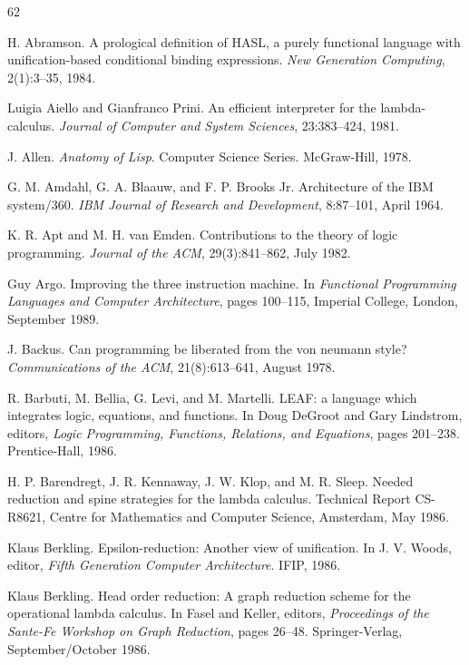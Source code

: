 \begin{thebibliography}{62}

H. Abramson.
A prological definition of HASL, a purely functional language with
unification-based conditional binding expressions.
\emph{New Generation Computing}, 2(1):3--35, 1984.

Luigia Aiello and Gianfranco Prini.
An efficient interpreter for the lambda-calculus.
\emph{Journal of Computer and System Sciences}, 23:383--424, 1981.

J. Allen.
\emph{Anatomy of Lisp}.
Computer Science Series. McGraw-Hill, 1978.

G. M. Amdahl, G. A. Blaauw, and F. P. Brooks Jr.
Architecture of the IBM system/360.
\emph{IBM Journal of Research and Development}, 8:87--101, April 1964.

K. R. Apt and M. H. van Emden.
Contributions to the theory of logic programming.
\emph{Journal of the ACM}, 29(3):841--862, July 1982.

Guy Argo.
Improving the three instruction machine.
In \emph{Functional Programming Languages and Computer Architecture}, pages
100--115, Imperial College, London, September 1989.

J. Backus.
Can programming be liberated from the von neumann style?
\emph{Communications of the ACM}, 21(8):613--641, August 1978.

R. Barbuti, M. Bellia, G. Levi, and M. Martelli.
LEAF: a language which integrates logic, equations, and functions.
In Doug DeGroot and Gary Lindstrom, editors, \emph{Logic Programming,
Functions, Relations, and Equations}, pages 201--238. Prentice-Hall, 1986.

H. P. Barendregt, J. R. Kennaway, J. W. Klop, and M. R. Sleep.
Needed reduction and spine strategies for the lambda calculus.
Technical Report CS-R8621, Centre for Mathematics and Computer Science,
Amsterdam, May 1986.

Klaus Berkling.
Epsilon-reduction: Another view of unification.
In J. V. Woods, editor, \emph{Fifth Generation Computer Architecture}. IFIP,
1986.

Klaus Berkling.
Head order reduction: A graph reduction scheme for the operational lambda
calculus.
In Fasel and Keller, editors, \emph{Proceedings of the Sante-Fe Workshop on
Graph Reduction}, pages 26--48. Springer-Verlag, September/October 1986.


\end{thebibliography}
